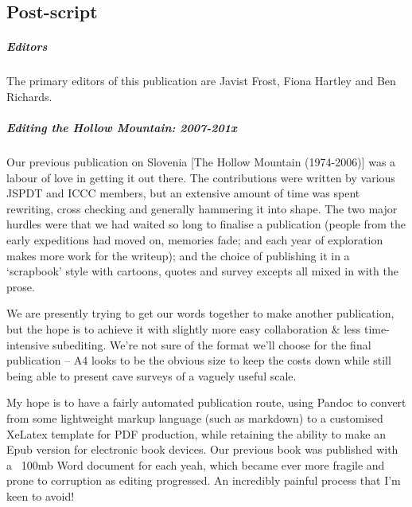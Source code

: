 \newpage
 
 \begin{tcolorbox}
 	\begin{fullwidth}
 	\chapter{Post-script}
 		\begin{multicols}{2}


            \paragraph{Editors}
            The primary editors of this publication are Javist Frost, Fiona Hartley and Ben Richards. 


            \paragraph{Editing the Hollow Mountain: 2007-201x}

            Our previous publication on Slovenia [The Hollow Mountain (1974-2006)] was a labour of love in getting it out there. The contributions were written by various JSPDT and ICCC members, but an extensive amount of time was spent rewriting, cross checking and generally hammering it into shape. The two major hurdles were that we had waited so long to finalise a publication (people from the early expeditions had moved on, memories fade; and each year of exploration makes more work for the writeup); and the choice of publishing it in a ‘scrapbook’ style with cartoons, quotes and survey excepts all mixed in with the prose.
            
            We are presently trying to get our words together to make another publication, but the hope is to achieve it with slightly more easy collaboration \& less time-intensive subediting. We’re not sure of the format we’ll choose for the final publication – A4 looks to be the obvious size to keep the costs down while still being able to present cave surveys of a vaguely useful scale.
            
            My hope is to have a fairly automated publication route, using Pandoc to convert from some lightweight markup language (such as markdown) to a customised XeLatex template for PDF production, while retaining the ability to make an Epub version for electronic book devices. Our previous book was published with a ~100mb Word document for each yeah, which became ever more fragile and prone to corruption as editing progressed. An incredibly painful process that I’m keen to avoid! 
            

\end{multicols}
\end{fullwidth}
\end{tcolorbox}
